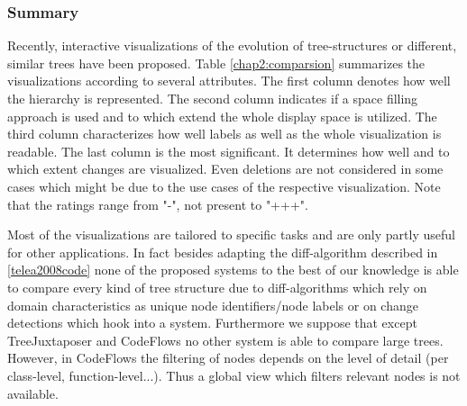 
\subsubsection{Summary}
Recently, interactive visualizations of the evolution of tree-structures or different, similar trees have been proposed. Table \ref{chap2:comparsion} summarizes the visualizations according to several attributes. The first column denotes how well the hierarchy is represented. The second column indicates if a space filling approach is used and to which extend the whole display space is utilized. The third column characterizes how well labels as well as the whole visualization is readable. The last column is the most significant. It determines how well and to which extent changes are visualized. Even deletions are not considered in some cases which might be due to the use cases of the respective visualization. Note that the ratings range from "-", not present to "+++".

Most of the visualizations are tailored to specific tasks and are only partly useful for other applications. In fact besides adapting the diff-algorithm described in \ref{telea2008code} none of the proposed systems to the best of our knowledge is able to compare every kind of tree structure due to diff-algorithms which rely on domain characteristics as unique node identifiers/node labels or on change detections which hook into a system. Furthermore we suppose that except TreeJuxtaposer and CodeFlows no other system is able to compare large trees. However, in CodeFlows the filtering of nodes depends on the level of detail (per class-level, function-level...). Thus a global view which filters relevant nodes is not available.






